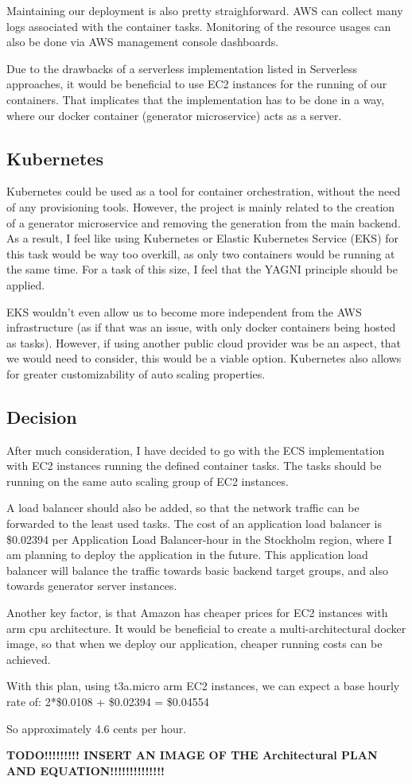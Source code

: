 		Maintaining our deployment is also pretty straighforward. AWS can collect many logs associated with 
		the container tasks. Monitoring of the resource usages can also be done via AWS management console dashboards.

		Due to the drawbacks of a serverless implementation listed in Serverless approaches, it would be beneficial to use EC2 instances
		for the running of our containers. That implicates that the implementation has to be done in a way, where our docker container (generator
		microservice) acts as a server.

	\subsection{Kubernetes}
		Kubernetes could be used as a tool for container orchestration, without the need of any provisioning tools. 
		However, the project is mainly related to the creation of a generator
		microservice and removing the generation from the main backend. As a result, I feel like using 
		Kubernetes or Elastic Kubernetes Service (EKS) for this task
		would be way too overkill, as only two containers would be running at the same time. 
		For a task of this size, I feel that the YAGNI principle should be applied.
		
		EKS wouldn't even allow us to become more independent
		from the AWS infrastructure (as if that was an issue, with only docker containers being hosted as tasks). However, if using another 
		public cloud provider was be an aspect, that we would need to consider, this would be a viable option. Kubernetes also allows for 
		greater customizability of auto scaling properties.

	\subsection{Decision}
		After much consideration, I have decided to go with the ECS implementation with EC2 instances running the defined container tasks.
		The tasks should be running on the same auto scaling group of EC2 instances. 
		
		A load balancer should also be added, so that the 
		network traffic can be forwarded to the least used tasks. The cost of an application load balancer is \$0.02394 per Application 
		Load Balancer-hour in the Stockholm region, where I am planning to deploy the application in the future. This application load balancer
		will balance the traffic towards basic backend target groups, and also towards generator server instances.

		Another key factor, is that Amazon has cheaper prices for EC2 instances with arm cpu architecture. It would be beneficial
		to create a multi-architectural docker image, so that when we deploy our application, cheaper running costs can be 
		achieved.

		With this plan, using t3a.micro arm EC2 instances, we can expect a base hourly rate of: 2*\$0.0108 + \$0.02394 = \$0.04554

		So approximately 4.6 cents per hour.

		\textbf{TODO!!!!!!!!! INSERT AN IMAGE OF THE Architectural PLAN AND EQUATION!!!!!!!!!!!!!!}